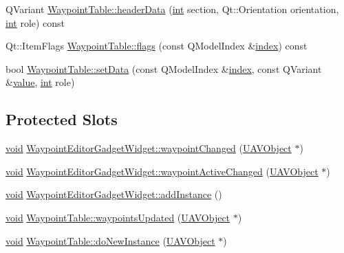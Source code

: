 \begin{DoxyCompactItemize}
\item 
Q\-Variant \hyperlink{group___waypoint_editor_gadget_plugin_ga73be101f51619703a8a69f23849f87b6}{Waypoint\-Table\-::header\-Data} (\hyperlink{ioapi_8h_a787fa3cf048117ba7123753c1e74fcd6}{int} section, Qt\-::\-Orientation orientation, \hyperlink{ioapi_8h_a787fa3cf048117ba7123753c1e74fcd6}{int} role) const 
\item 
Qt\-::\-Item\-Flags \hyperlink{group___waypoint_editor_gadget_plugin_ga268c5385ef4dc152ddcee5ff2fddbaba}{Waypoint\-Table\-::flags} (const Q\-Model\-Index \&\hyperlink{glext_8h_ab47dd9958bcadea08866b42bf358e95e}{index}) const 
\item 
bool \hyperlink{group___waypoint_editor_gadget_plugin_gae65ee6e837693667105fc594acc874eb}{Waypoint\-Table\-::set\-Data} (const Q\-Model\-Index \&\hyperlink{glext_8h_ab47dd9958bcadea08866b42bf358e95e}{index}, const Q\-Variant \&\hyperlink{glext_8h_aa0e2e9cea7f208d28acda0480144beb0}{value}, \hyperlink{ioapi_8h_a787fa3cf048117ba7123753c1e74fcd6}{int} role)
\end{DoxyCompactItemize}
\subsection*{Protected Slots}
\begin{DoxyCompactItemize}
\item 
\hyperlink{group___u_a_v_objects_plugin_ga444cf2ff3f0ecbe028adce838d373f5c}{void} \hyperlink{group___waypoint_editor_gadget_plugin_gaf94d2aa5249b20561783e93b04428875}{Waypoint\-Editor\-Gadget\-Widget\-::waypoint\-Changed} (\hyperlink{class_u_a_v_object}{U\-A\-V\-Object} $\ast$)
\item 
\hyperlink{group___u_a_v_objects_plugin_ga444cf2ff3f0ecbe028adce838d373f5c}{void} \hyperlink{group___waypoint_editor_gadget_plugin_ga3f3ab4714a439f9a90e34a03506a4f38}{Waypoint\-Editor\-Gadget\-Widget\-::waypoint\-Active\-Changed} (\hyperlink{class_u_a_v_object}{U\-A\-V\-Object} $\ast$)
\item 
\hyperlink{group___u_a_v_objects_plugin_ga444cf2ff3f0ecbe028adce838d373f5c}{void} \hyperlink{group___waypoint_editor_gadget_plugin_ga1cdc4fa0f69ba28ea67dc549588c0cf6}{Waypoint\-Editor\-Gadget\-Widget\-::add\-Instance} ()
\item 
\hyperlink{group___u_a_v_objects_plugin_ga444cf2ff3f0ecbe028adce838d373f5c}{void} \hyperlink{group___waypoint_editor_gadget_plugin_ga8bb82818bb89a4aa0b56bdda689058cd}{Waypoint\-Table\-::waypoints\-Updated} (\hyperlink{class_u_a_v_object}{U\-A\-V\-Object} $\ast$)
\item 
\hyperlink{group___u_a_v_objects_plugin_ga444cf2ff3f0ecbe028adce838d373f5c}{void} \hyperlink{group___waypoint_editor_gadget_plugin_gadfa77191d509fa658e36cdff9553dd25}{Waypoint\-Table\-::do\-New\-Instance} (\hyperlink{class_u_a_v_object}{U\-A\-V\-Object} $\ast$)
\end{DoxyCompactItemize}


